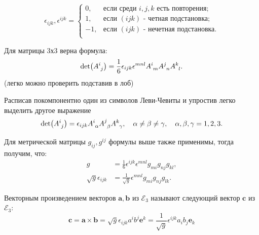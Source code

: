 
\begin{definition}
	\begin{equation*}
		\epsilon_{ijk},\epsilon^{ijk} = \begin{cases}
			0, &\text{если среди $i,j,k$ есть повторения};\\
			1, &\text{если $(ijk)$ - четная подстановка};\\
			-1,&\text{если $(ijk)$ - нечетная подстановка}.\\
		\end{cases}
	\end{equation*}
\end{definition}

\begin{definition}[Определитель]
	Для матрицы 3х3 верна формула:
	\begin{equation*}
		\det(\tensor{A}{^i_j}) = \frac{1}{6}\epsilon_{ijk}\epsilon^{mnl}\tensor{A}{^i_m}\tensor{A}{^j_n}\tensor{A}{^k_l}.
	\end{equation*}
	(легко можно проверить подставив в лоб)
	
	Расписав покомпонентно один из символов Леви-Чевиты и упростив легко выделить другое выражение
	\begin{equation*}
		\det(\tensor{A}{^i_j}) = \epsilon_{ijk}\tensor{A}{^i_\alpha}\tensor{A}{^j_\beta}\tensor{A}{^k_\gamma},\quad \alpha\neq\beta\neq\gamma,\quad\alpha,\beta,\gamma=1,2,3.
	\end{equation*}
\end{definition}

Для метрической матрицы $g_{ij}, g^{ij}$ формулы выше также применимы, тогда получим, что:
\begin{align*}
	g &= \frac{1}{6}\epsilon^{ijk}\epsilon^{mnl}g_{mi}g_{nj}g_{kl},\\
	\sqrt{g}\epsilon_{ijk}&=\frac{1}{\sqrt{g}}\epsilon^{mnl}g_{mi}g_{nj}g_{lk}.
\end{align*}

\begin{definition}
	Векторным произведением векторов $\mathbf{a}, \mathbf{b}$ из $\mathcal{E}_3$ называют следующий вектор $\mathbf{c}$ из $\mathcal{E}_3$:
	\begin{equation*}
		\mathbf{c} = \mathbf{a} \times \mathbf{b} = \sqrt{g} \epsilon_{ijk} a^ib^j\mathbf{e}^k = \frac{1}{\sqrt{g}}\epsilon^{ijk} a_ib_j\mathbf{e}_k
	\end{equation*}
\end{definition}

